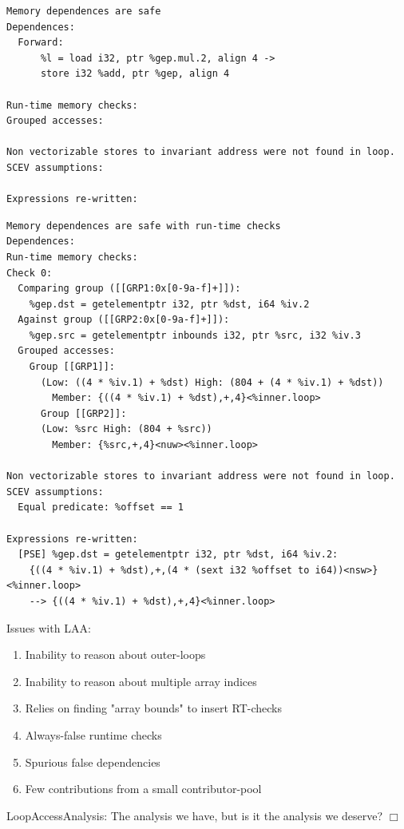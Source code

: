 \documentclass{beamer}
\begin{document}
\begin{frame}[containsverbatim]
  \begin{adjustwidth}{-1em}{-1em}
    \begin{verbatim}
Memory dependences are safe
Dependences:
  Forward:
      %l = load i32, ptr %gep.mul.2, align 4 ->
      store i32 %add, ptr %gep, align 4

Run-time memory checks:
Grouped accesses:

Non vectorizable stores to invariant address were not found in loop.
SCEV assumptions:

Expressions re-written:
    \end{verbatim}
  \end{adjustwidth}
\end{frame}

\begin{frame}[containsverbatim]
  \begin{adjustwidth}{-1em}{-1em}
    \begin{verbatim}
Memory dependences are safe with run-time checks
Dependences:
Run-time memory checks:
Check 0:
  Comparing group ([[GRP1:0x[0-9a-f]+]]):
    %gep.dst = getelementptr i32, ptr %dst, i64 %iv.2
  Against group ([[GRP2:0x[0-9a-f]+]]):
    %gep.src = getelementptr inbounds i32, ptr %src, i32 %iv.3
  Grouped accesses:
    Group [[GRP1]]:
      (Low: ((4 * %iv.1) + %dst) High: (804 + (4 * %iv.1) + %dst))
        Member: {((4 * %iv.1) + %dst),+,4}<%inner.loop>
      Group [[GRP2]]:
      (Low: %src High: (804 + %src))
        Member: {%src,+,4}<nuw><%inner.loop>

Non vectorizable stores to invariant address were not found in loop.
SCEV assumptions:
  Equal predicate: %offset == 1

Expressions re-written:
  [PSE] %gep.dst = getelementptr i32, ptr %dst, i64 %iv.2:
    {((4 * %iv.1) + %dst),+,(4 * (sext i32 %offset to i64))<nsw>}<%inner.loop>
    --> {((4 * %iv.1) + %dst),+,4}<%inner.loop>
    \end{verbatim}
  \end{adjustwidth}
\end{frame}

\begin{frame}
  Issues with LAA:
  \begin{enumerate}
    \item Inability to reason about outer-loops
    \item Inability to reason about multiple array indices
    \item Relies on finding "array bounds" to insert RT-checks
    \item Always-false runtime checks
    \item Spurious false dependencies
    \item Few contributions from a small contributor-pool
  \end{enumerate}
\end{frame}

\begin{frame}
  LoopAccessAnalysis: The analysis we have, but is it the analysis we deserve? $\Box$
\end{frame}
\end{document}
